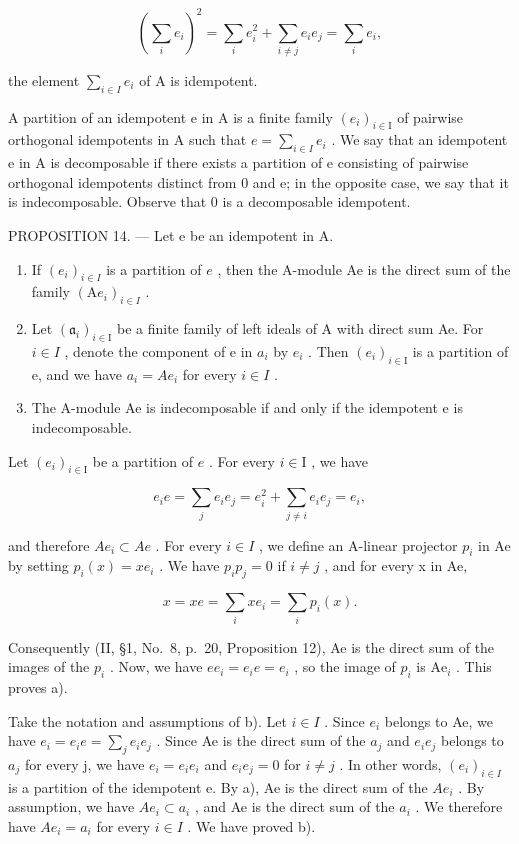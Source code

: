 \[
\left(\sum_ {i} e _ {i}\right) ^ {2} = \sum_ {i} e _ {i} ^ {2} + \sum_ {i \neq j} e _ {i} e _ {j} = \sum_ {i} e _ {i},
\]

the element \(\sum_{i\in I}e_i\) of A is idempotent.

A partition of an idempotent e in A is a finite family \((e_{i})_{i\in\mathrm{I}}\) of pairwise orthogonal idempotents in A such that \(e=\sum_{i\in I}e_{i}\) . We say that an idempotent e in A is decomposable if there exists a partition of e consisting of pairwise orthogonal idempotents distinct from 0 and e; in the opposite case, we say that it is indecomposable. Observe that 0 is a decomposable idempotent.

PROPOSITION 14. --- Let e be an idempotent in A.

\begin{enumerate}
\def\labelenumi{\alph{enumi})}
\item
  If \((e_i)_{i\in I}\) is a partition of \(e\) , then the A-module Ae is the direct sum of the family \((\mathrm{A}e_i)_{i\in I}\) .
\item
  Let \((\mathfrak{a}_{i})_{i\in\mathrm{I}}\) be a finite family of left ideals of A with direct sum Ae. For \(i\in I\) , denote the component of e in \(a_{i}\) by \(e_{i}\) . Then \((e_{i})_{i\in\mathrm{I}}\) is a partition of e, and we have \(a_{i}=Ae_{i}\) for every \(i\in I\) .
\item
  The A-module Ae is indecomposable if and only if the idempotent e is indecomposable.
\end{enumerate}

Let \((e_i)_{i\in \mathrm{I}}\) be a partition of \(e\) . For every \(i\in \mathrm{I}\) , we have

\[
e _ {i} e = \sum_ {j} e _ {i} e _ {j} = e _ {i} ^ {2} + \sum_ {j \neq i} e _ {i} e _ {j} = e _ {i},
\]

and therefore \(Ae_{i} \subset Ae\) . For every \(i \in I\) , we define an A-linear projector \(p_{i}\) in Ae by setting \(p_{i}(x) = xe_{i}\) . We have \(p_{i}p_{j} = 0\) if \(i \neq j\) , and for every x in Ae,

\[
x = x e = \sum_ {i} x e _ {i} = \sum_ {i} p _ {i} (x).
\]

Consequently (II, §1, No.~8, p.~20, Proposition 12), Ae is the direct sum of the images of the \(p_i\) . Now, we have \(ee_i = e_i e = e_i\) , so the image of \(p_i\) is \(\mathrm{Ae}_i\) . This proves a).

Take the notation and assumptions of b). Let \(i \in I\) . Since \(e_{i}\) belongs to Ae, we have \(e_{i} = e_{i}e = \sum_{j} e_{i}e_{j}\) . Since Ae is the direct sum of the \(a_{j}\) and \(e_{i}e_{j}\) belongs to \(a_{j}\) for every j, we have \(e_{i} = e_{i}e_{i}\) and \(e_{i}e_{j} = 0\) for \(i \neq j\) . In other words, \((e_{i})_{i \in I}\) is a partition of the idempotent e. By a), Ae is the direct sum of the \(Ae_{i}\) . By assumption, we have \(Ae_{i} \subset a_{i}\) , and Ae is the direct sum of the \(a_{i}\) . We therefore have \(Ae_{i} = a_{i}\) for every \(i \in I\) . We have proved b).

